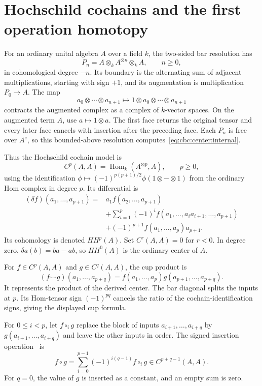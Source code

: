 \section{Hochschild cochains and the first operation homotopy}

For an ordinary unital algebra $A$ over a field $k$, the two-sided bar resolution has
\[
 P_n=A\otimes_k A^{\otimes n}\otimes_k A,\qquad n\geq0,
\]
in cohomological degree $-n$.
Its boundary is the alternating sum of adjacent multiplications, starting with sign $+1$, and its augmentation is multiplication $P_0\to A$.
The map
\[
 a_0\otimes\cdots\otimes a_{n+1}
 \longmapsto1\otimes a_0\otimes\cdots\otimes a_{n+1}
\]
contracts the augmented complex as a complex of $k$-vector spaces.
On the augmented term $A$, use $a\mapsto1\otimes a$.
The first face returns the original tensor and every later face cancels with insertion after the preceding face.
Each $P_n$ is free over $A^e$, so this bounded-above resolution computes~\eqref{eq:cbc:center:internal}.

Thus the Hochschild cochain model is
\[
 C^p(A,A)=\operatorname{Hom}_k(A^{\otimes p},A),\qquad p\geq0,
\]
using the identification
$\phi\mapsto(-1)^{p(p+1)/2}\phi(1\otimes-\otimes1)$ from the ordinary Hom complex in degree $p$.
Its differential is
\begin{equation}\label{eq:cbc:center:hoch-differential}
\begin{aligned}
 (\delta f)(a_1,\ldots,a_{p+1})
 ={}&a_1f(a_2,\ldots,a_{p+1})\\
 &+\sum_{i=1}^{p}(-1)^i
     f(a_1,\ldots,a_i a_{i+1},\ldots,a_{p+1})\\
 &+(-1)^{p+1}f(a_1,\ldots,a_p)a_{p+1}.
\end{aligned}
\end{equation}
Its cohomology is denoted $HH^p(A)$.
Set $C^r(A,A)=0$ for $r<0$.
In degree zero, $\delta a(b)=ba-ab$, so $HH^0(A)$ is the ordinary center of $A$.

For $f\in C^p(A,A)$ and $g\in C^q(A,A)$, the cup product is
\[
 (f\smile g)(a_1,\ldots,a_{p+q})
   =f(a_1,\ldots,a_p)g(a_{p+1},\ldots,a_{p+q}).
\]
It represents the product of the derived center.
The bar diagonal splits the inputs at $p$.
Its Hom-tensor sign $(-1)^{pq}$ cancels the ratio of the cochain-identification signs, giving the displayed cup formula.

For $0\leq i<p$, let $f\circ_i g$ replace the block of inputs $a_{i+1},\ldots,a_{i+q}$ by $g(a_{i+1},\ldots,a_{i+q})$ and leave the other inputs in order.
The signed insertion operation~\cite[\S1]{McClureSmith} is
\begin{equation}\label{eq:cbc:center:insertion}
 f\circ g=\sum_{i=0}^{p-1}(-1)^{i(q-1)}f\circ_i g
 \in C^{p+q-1}(A,A).
\end{equation}
For $q=0$, the value of $g$ is inserted as a constant, and an empty sum is zero.

